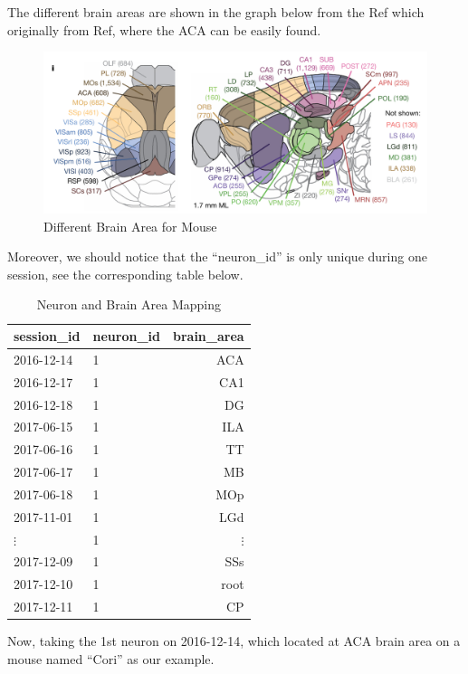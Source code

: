 \documentclass{article}
\begin{document}
	\par The different brain areas are shown in the graph below from the Ref\cite{ref1} which originally from Ref\cite{ref2}, where the ACA can be easily found.
	\begin{figure}[htbp]
		\centering
		\includegraphics[scale = 0.6]{Pics/007}
		\caption{Different Brain Area for Mouse}
		\label{fig:007}
	\end{figure}
	\clearpage
	Moreover, we should notice that the ``neuron\_id'' is only unique during one session, see the corresponding table below.
	\begin{table}[htbp]
		\begin{tabular}{llr}
			\toprule
			\textbf{session\_id} & \textbf{neuron\_id} & \textbf{brain\_area} \\
			\midrule
			2016-12-14 & 1 & ACA \\
			2016-12-17 & 1 & CA1 \\
			2016-12-18 & 1 & DG \\
			2017-06-15 & 1 & ILA \\
			2017-06-16 & 1 & TT \\
			2017-06-17 & 1 & MB \\
			2017-06-18 & 1 & MOp \\
			2017-11-01 & 1 & LGd \\
			$\vdots$   &1  &$\vdots$\\
			2017-12-09 & 1 & SSs \\
			2017-12-10 & 1 & root \\
			2017-12-11 & 1 & CP \\
			\bottomrule
		\end{tabular}
		\centering
		\caption{Neuron and Brain Area Mapping}
		\label{tab:neuron_brain_area}
	\end{table}
	\par Now, taking the 1st neuron on 2016-12-14, which located at ACA brain area on a mouse named ``Cori'' as our example. 
\end{document}
